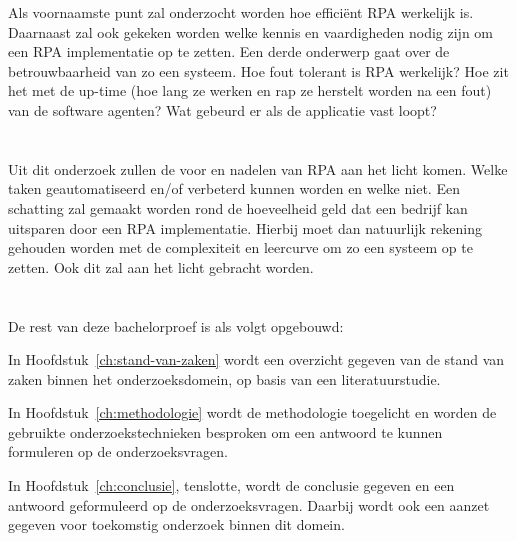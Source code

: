 Als voornaamste punt zal onderzocht worden hoe efficiënt RPA werkelijk is. Daarnaast zal ook gekeken worden welke kennis en vaardigheden nodig zijn om een RPA implementatie op te zetten. Een derde onderwerp gaat over de betrouwbaarheid van zo een systeem. Hoe fout tolerant is RPA werkelijk? Hoe zit het met de up-time (hoe lang ze werken en rap ze herstelt worden na een fout) van de software agenten? Wat gebeurd er als de applicatie vast loopt?

\section{}
\label{sec:onderzoeksdoelstelling}

Uit dit onderzoek zullen de voor en nadelen van RPA aan het licht komen. Welke taken geautomatiseerd en/of verbeterd kunnen worden en welke niet.
Een schatting zal gemaakt worden rond de hoeveelheid geld dat een bedrijf kan uitsparen door een RPA implementatie. Hierbij moet dan natuurlijk rekening gehouden worden met de complexiteit en leercurve om zo een systeem op te zetten. Ook dit zal aan het licht gebracht worden.

\section{}
\label{sec:opzet-bachelorproef}


De rest van deze bachelorproef is als volgt opgebouwd:

In Hoofdstuk~\ref{ch:stand-van-zaken} wordt een overzicht gegeven van de stand van zaken binnen het onderzoeksdomein, op basis van een literatuurstudie.

In Hoofdstuk~\ref{ch:methodologie} wordt de methodologie toegelicht en worden de gebruikte onderzoekstechnieken besproken om een antwoord te kunnen formuleren op de onderzoeksvragen.


In Hoofdstuk~\ref{ch:conclusie}, tenslotte, wordt de conclusie gegeven en een antwoord geformuleerd op de onderzoeksvragen. Daarbij wordt ook een aanzet gegeven voor toekomstig onderzoek binnen dit domein.